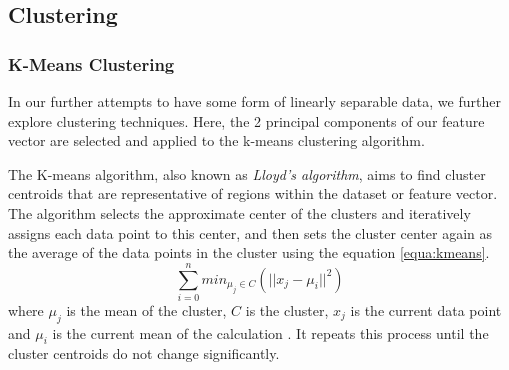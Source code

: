 \documentclass[a4paper,12pt]{report}
\begin{document}
		
		
		
		
		
		
		\subsection{Clustering}
			\subsubsection{K-Means Clustering}
			In our further attempts to have some form of linearly separable data, we further explore clustering techniques. Here, the 2 principal components of our feature vector are selected and applied to the k-means clustering algorithm.
			
			The K-means algorithm, also known as \textit{Lloyd's algorithm}, aims to find cluster centroids that are representative of regions within the dataset or feature vector. The algorithm selects the approximate center of the clusters and iteratively assigns each data point to this center, and then sets the cluster center again as the average of the data points in the cluster using the equation \ref{equa:kmeans}.
				\begin{equation}
					\label{equa:kmeans}
					\sum_{i=0}^{n}min_{\mu_{j} \in C}(||x_{j} - \mu_{i}||^{2})
				\end{equation}
			where $\mu_{j}$ is the mean of the cluster, $C$ is the cluster, $x_{j}$ is the current data point and $\mu_{i}$ is the current mean of the calculation \cite{Sculley2010}.
			It repeats this process until the cluster centroids do not change significantly.
\end{document}
